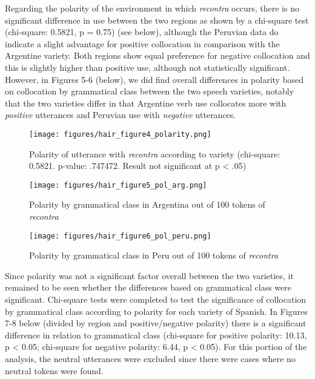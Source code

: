 \documentclass[output=paper,colorlinks,citecolor=brown,
]{langscibook}
\begin{document}
 Regarding the polarity of the environment in which \textit{recontra} occurs, there is no significant difference in use between the two regions as shown by a chi-square test (chi-square: 0.5821, p = 0.75) (see  below), although the Peruvian data do indicate a slight advantage for positive collocation in comparison with the Argentine variety. Both regions show equal preference for negative collocation and this is slightly higher than positive use, although  not statistically significant. However, in Figures 5-6 (below), we did find overall differences in polarity based on collocation by grammatical class between the two speech varieties, notably that the two varieties differ in that Argentine verb use collocates more with \textit{positive} utterances and Peruvian use with \textit{negative} utterances. 
 
 
 \begin{figure}
     
     \texttt{[image: figures/hair\_figure4\_polarity.png]}
     \caption{Polarity of utterance with \textit{recontra} according to variety (chi-square: 0.5821. p-value: .747472. Result not significant at p < .05)}
     \label{fig:hair:4}
 \end{figure}
 
 
 \begin{figure}
     
     \texttt{[image: figures/hair\_figure5\_pol\_arg.png]}
     \caption{Polarity by grammatical class in Argentina out of 100 tokens of \textit{recontra}}
     \label{fig:hair:5}
 \end{figure}


 \begin{figure}
     
     \texttt{[image: figures/hair\_figure6\_pol\_peru.png]}
     \caption{Polarity by grammatical class in Peru out of 100 tokens of \textit{recontra}}
     \label{fig:hair:6}
 \end{figure}
 


Since polarity was not a significant factor overall between the two varieties, it remained to be seen whether the differences based on grammatical class were significant. Chi-square tests were completed to test the significance of collocation by grammatical class according to polarity for each variety of Spanish. In Figures 7-8 below (divided by region and positive/negative polarity) there is a significant difference in relation to grammatical class (chi-square for positive polarity: 10.13, p < 0.05; chi-square for negative polarity: 6.44, p < 0.05). For this portion of the analysis, the neutral utterances were excluded since there were cases where no neutral tokens were found.
\end{document}
